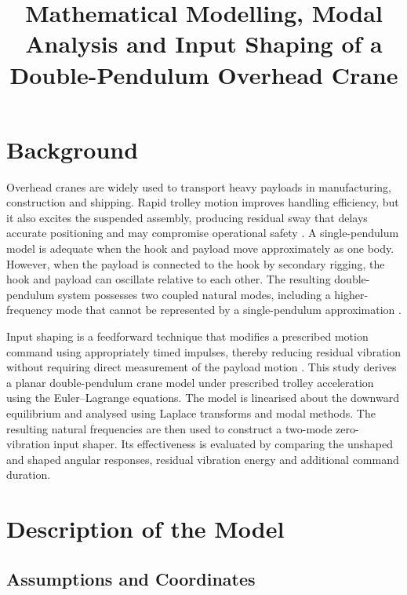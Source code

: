 \documentclass[a4paper,11pt]{article}
\title{Mathematical Modelling, Modal Analysis and Input Shaping of a Double-Pendulum Overhead Crane}
\author{}
\date{}
\begin{document}
\maketitle

\section{Background}

Overhead cranes are widely used to transport heavy payloads in manufacturing,
construction and shipping. Rapid trolley motion improves handling efficiency,
but it also excites the suspended assembly, producing residual sway that delays
accurate positioning and may compromise operational safety
\cite{AbdelRahman2003}. A single-pendulum model is adequate when the hook and
payload move approximately as one body. However, when the payload is connected
to the hook by secondary rigging, the hook and payload can oscillate relative to
each other. The resulting double-pendulum system possesses two coupled natural
modes, including a higher-frequency mode that cannot be represented by a
single-pendulum approximation \cite{Singhose2008}.

Input shaping is a feedforward technique that modifies a prescribed motion
command using appropriately timed impulses, thereby reducing residual vibration
without requiring direct measurement of the payload motion
\cite{SingerSeering1990}. This study derives a planar double-pendulum crane model
under prescribed trolley acceleration using the Euler--Lagrange equations. The
model is linearised about the downward equilibrium and analysed using Laplace
transforms and modal methods. The resulting natural frequencies are then used
to construct a two-mode zero-vibration input shaper. Its effectiveness is
evaluated by comparing the unshaped and shaped angular responses, residual
vibration energy and additional command duration.

\section{Description of the Model}

\subsection{Assumptions and Coordinates}
\end{document}
